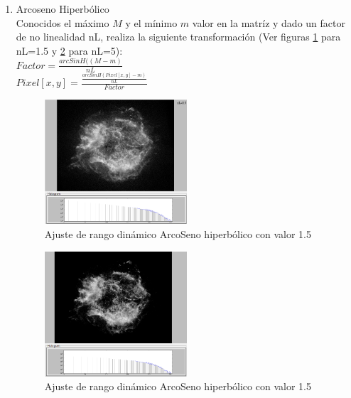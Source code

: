 \begin{enumerate}
		
		\item Arcoseno Hiperbólico\\
		Conocidos el máximo $M$ y el mínimo $m$ valor en la matríz y dado
		un factor de no linealidad nL, realiza la siguiente transformación  (Ver figuras \ref{fig:HDRasinh1_5} para nL=1.5 y \ref{fig:HDRasinh5} para nL=5):\\
			$Factor=\frac{arcSinH((M-m)}{nL}$
			\\
			$Pixel[x,y]=\frac{\frac{arcSinH(Pixel[x,y]-m)}{nL}}{Factor}$
			\\
			\begin{figure}[!htb]
				\centering
				\includegraphics[width=0.5\textwidth]{images/HDREQ/chandraaSinH_0_5.jpg}
				\caption{\label{fig:HDRasinh1_5}Ajuste de rango dinámico ArcoSeno hiperbólico con valor 1.5}
			\end{figure}
			\begin{figure}[!htb]
				\centering
				\includegraphics[width=0.5\textwidth]{images/HDREQ/chandraaSinH_5.PNG}
				\caption{\label{fig:HDRasinh5}Ajuste de rango dinámico ArcoSeno hiperbólico con valor 1.5}
			\end{figure}


\end{enumerate}
